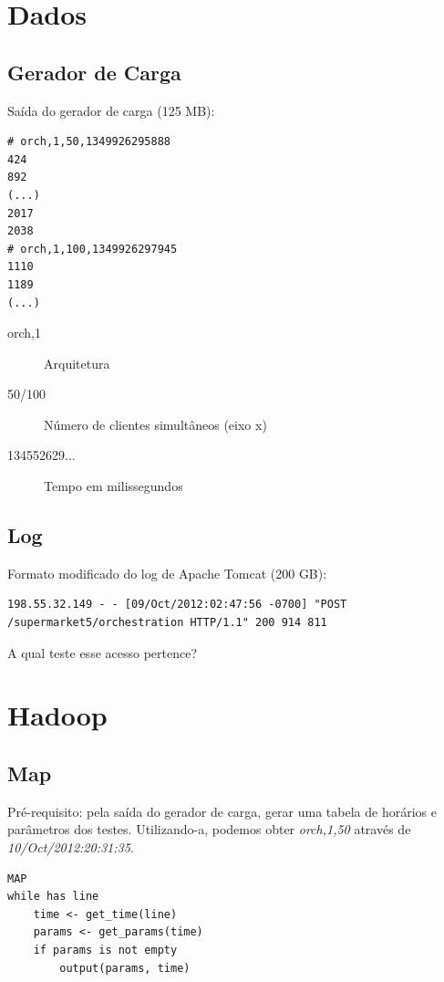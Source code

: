 \documentclass{beamer}
\begin{document}
\section{Dados}

\subsection{Gerador de Carga}
\begin{frame}[fragile]
Saída do gerador de carga (125 MB):

\begin{verbatim}
# orch,1,50,1349926295888
424
892
(...)
2017
2038
# orch,1,100,1349926297945
1110
1189
(...)
\end{verbatim}

\begin{description}
\item[orch,1] Arquitetura
\item[50/100] Número de clientes simultâneos (eixo x)
\item[134552629...] Tempo em milissegundos
\end{description}
\end{frame}

\subsection{Log}
\begin{frame}[fragile]
Formato modificado do log de Apache Tomcat (200 GB):
\begin{verbatim}
198.55.32.149 - - [09/Oct/2012:02:47:56 -0700] "POST
/supermarket5/orchestration HTTP/1.1" 200 914 811
\end{verbatim}
A qual teste esse acesso pertence?
\end{frame}

\section{Hadoop}
\subsection{Map}
\begin{frame}[fragile]
Pré-requisito: pela saída do gerador de carga, gerar uma tabela de horários e parâmetros dos testes. Utilizando-a, podemos obter \emph{orch,1,50} através de \emph{10/Oct/2012:20:31:35}.

\begin{verbatim}
MAP
while has line
    time <- get_time(line)
    params <- get_params(time)
    if params is not empty
        output(params, time)
\end{verbatim}
\end{frame}
\end{document}
